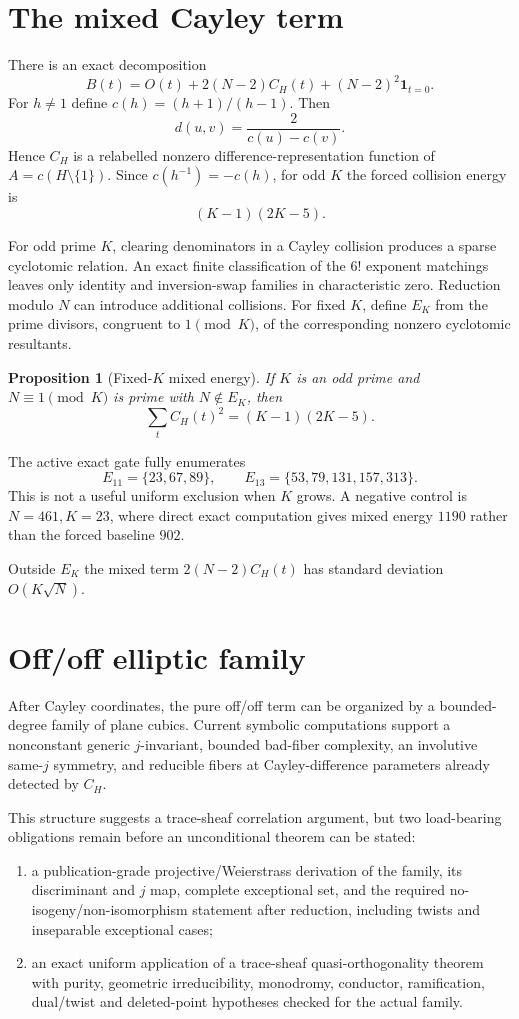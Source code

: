 \documentclass[11pt]{article}
\newtheorem{proposition}[theorem]{Proposition}
\newcommand{\1}{\mathbf 1}
\begin{document}
\section{The mixed Cayley term}
There is an exact decomposition
\[
B(t)=O(t)+2(N-2)C_H(t)+(N-2)^2\1_{t=0}.
\]
For $h\ne1$ define $c(h)=(h+1)/(h-1)$. Then
\[
d(u,v)=\frac{2}{c(u)-c(v)}.
\]
Hence $C_H$ is a relabelled nonzero difference-representation function of $A=c(H\setminus\{1\})$. Since $c(h^{-1})=-c(h)$, for odd $K$ the forced collision energy is
\[
(K-1)(2K-5).
\]

For odd prime $K$, clearing denominators in a Cayley collision produces a sparse cyclotomic relation. An exact finite classification of the $6!$ exponent matchings leaves only identity and inversion-swap families in characteristic zero. Reduction modulo $N$ can introduce additional collisions. For fixed $K$, define $E_K$ from the prime divisors, congruent to $1\pmod K$, of the corresponding nonzero cyclotomic resultants.

\begin{proposition}[Fixed-$K$ mixed energy]
If $K$ is an odd prime and $N\equiv1\pmod K$ is prime with $N\notin E_K$, then
\[
\sum_tC_H(t)^2=(K-1)(2K-5).
\]
\end{proposition}

The active exact gate fully enumerates
\[
E_{11}=\{23,67,89\},\qquad E_{13}=\{53,79,131,157,313\}.
\]
This is not a useful uniform exclusion when $K$ grows. A negative control is $N=461,K=23$, where direct exact computation gives mixed energy $1190$ rather than the forced baseline $902$.

Outside $E_K$ the mixed term $2(N-2)C_H(t)$ has standard deviation $O(K\sqrt N)$.

\section{Off/off elliptic family}
After Cayley coordinates, the pure off/off term can be organized by a bounded-degree family of plane cubics. Current symbolic computations support a nonconstant generic $j$-invariant, bounded bad-fiber complexity, an involutive same-$j$ symmetry, and reducible fibers at Cayley-difference parameters already detected by $C_H$.

This structure suggests a trace-sheaf correlation argument, but two load-bearing obligations remain before an unconditional theorem can be stated:

\begin{enumerate}
\item a publication-grade projective/Weierstrass derivation of the family, its discriminant and $j$ map, complete exceptional set, and the required no-isogeny/non-isomorphism statement after reduction, including twists and inseparable exceptional cases;
\item an exact uniform application of a trace-sheaf quasi-orthogonality theorem with purity, geometric irreducibility, monodromy, conductor, ramification, dual/twist and deleted-point hypotheses checked for the actual family.
\end{enumerate}
\end{document}
